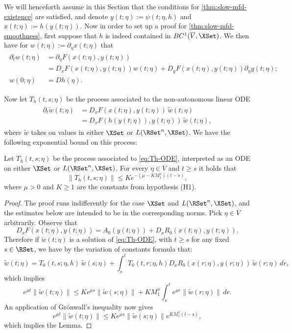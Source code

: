 \documentclass[a4paper]{siamart190516}
\begin{document}
 We will henceforth assume in this Section that the conditions for
 \cref{thm:slow-mfd-existence} are satisfied, and denote $y(t; \eta) := \psi(t; \eta,
 h)$ and $x(t; \eta) := h(y(t;\eta))$. Now in order to set up a proof for 
 \cref{thm:slow-mfd-smoothness}, first suppose that $h$ is indeed contained in
 $BC^1(\overline{V},\XSet)$.  We then have for $w(t;\eta) := \partial_\eta x(t;
 \eta)$ that
 \begin{align}
 \begin{split}\label{eq:w-ODE}
 \partial_t w(t; \eta) &= \partial_{\eta} F(x(t;\eta),y(t;\eta)) \\
 &= D_x F(x(t;\eta),y(t;\eta))  w(t;\eta) + D_y F(x(t;\eta),y(t;\eta))  \partial_{\eta} y(t;\eta); \\
 w(0; \eta) &= D h(\eta).
 \end{split}
 \end{align}
  
Now let $T_h(t,s; \eta)$ be the process associated to the non-autonomous linear ODE
\begin{align}
\begin{split}\label{eq:Th-ODE}
\partial_t \tilde{w}(t; \eta) &= D_x F(x(t;\eta),y(t;\eta))  \, \tilde{w}(t;\eta) \\
&=D_x F(h(y(t;\eta)),y(t;\eta)) \, \tilde{w}(t;\eta),
\end{split}
\end{align}
where $\tilde{w}$ takes on values in either $\XSet$ or $L(\RSet^n,\XSet)$. We have the following exponential bound on this process:
\begin{lemma}\label{lem:Th-props}
  Let $T_h(t,s;\eta)$ be the process associated to \cref{eq:Th-ODE}, interpreted as an
  ODE on either $\XSet$ or $L(\RSet^n,\XSet)$. For every $\eta \in \overline{V}$ and
  $t \geq s$ it holds that
\[
\|T_h(t,s;\eta) \| \leq K e^{-(\mu-K M^x_1)(t-s)},
\]
where $\mu > 0$ and $K \geq 1$ are the constants from hypothesis (H1).
\end{lemma}

\begin{proof}
  The proof runs indifferently for the case $\XSet$ and $L(\RSet^n,\XSet)$, and the
  estimates below are intended to be in the corresponding norms.
Pick $\eta \in \overline{V}$ arbitrarily. Observe that
\[
D_x F(x(t;\eta),y(t;\eta)) = A_0(y(t;\eta)) + D_x R_0(x(t;\eta),y(t;\eta)).
\]
Therefore if $\tilde{w}(t; \eta)$ is a solution of \cref{eq:Th-ODE}, with $t \geq s$ for any fixed $s \in \RSet$, we have by the variation of constants formula that:
\[
\tilde{w}(t; \eta) = T_0(t,s; \eta,h) \, \tilde{w}(s; \eta) + \int_s^t T_0(t,r; \eta, h) D_x R_0(x(r;\eta),y(r;\eta)) \, \tilde{w}(r; \eta) \, dr,
\]
which implies
\[
e^{\mu t} \| \tilde{w}(t; \eta) \| \leq K e^{\mu s} \|\tilde{w}(s; \eta) \| + K M^x_1 \int_s^t  e^{\mu r} \|\tilde{w}(r; \eta) \| \, dr.
\]
An application of Gr\"onwall's inequality now gives
\[
e^{\mu t} \| \tilde{w}(t; \eta) \| \leq K e^{\mu s} \| \tilde{w}(s; \eta) \| e^{K M^x_1 (t-s)},
\]
which implies the Lemma.
\end{proof}
\end{document}
